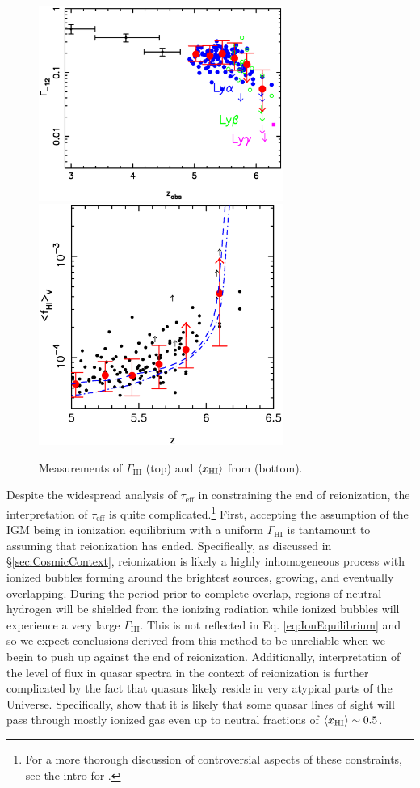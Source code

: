 \begin{figure}[h]
  \centering
  \includegraphics[width=8cm]{Fan.gamma.eps}
  \includegraphics[width=8cm]{Fan.fHv.eps}
  \caption{Measurements of $\Gamma_{\text{HI}}$ (top) and $\langle x_{\text{HI}}\rangle$ from \cite{Fan2006a} (bottom).}
  \label{fig:tauEffResults}
\end{figure}


Despite the widespread analysis of $\tau_{\text{eff}}$ in constraining the end of reionization, the interpretation of $\tau_{\text{eff}}$ is quite complicated.\footnote{For a more thorough discussion of controversial aspects of these constraints, see the intro for \cite{McGreer:2011dm}.} First, accepting the assumption of the IGM being in ionization equilibrium with a uniform $\Gamma_{\text{HI}}$ is tantamount to assuming that reionization has ended. Specifically, as discussed in \S \ref{sec:CosmicContext}, reionization is likely a highly inhomogeneous process with ionized bubbles forming around the brightest sources, growing, and eventually overlapping. During the period prior to complete overlap, regions of neutral hydrogen will be shielded from the ionizing radiation while ionized bubbles will experience a very large $\Gamma_{\text{HI}}$. This is not reflected in Eq. \ref{eq:IonEquilibrium} and so we expect conclusions derived from this method to be unreliable when we begin to push up against the end of reionization. Additionally, interpretation of the level of flux in quasar spectra in the context of reionization is further complicated by the fact that quasars likely reside in very atypical parts of the Universe. Specifically, \cite{Lidz:2007mz} show that it is likely that some quasar lines of sight will pass through mostly ionized gas even up to neutral fractions of $\langle x_{\text{HI}}\rangle \sim 0.5$. 

